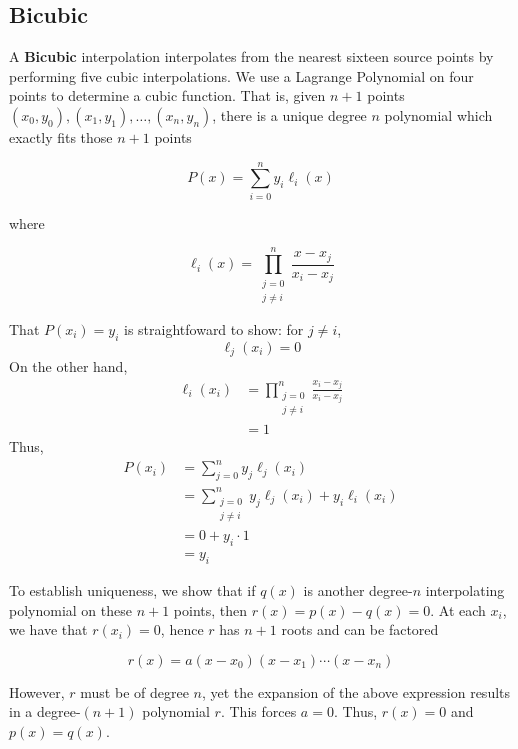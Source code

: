 \subsection{Bicubic} \label{subsec:bicubic}

A \textbf{Bicubic} interpolation interpolates from the nearest sixteen source points by performing five cubic interpolations. We use a Lagrange Polynomial on four points to determine a cubic function. That is, given $n+1$ points $(x_0,y_0), (x_1,y_1),\hdots, (x_n, y_n)$, there is a unique degree $n$ polynomial which exactly fits those $n+1$ points

\[P(x)=\sum_{i=0}^ny_i\ell_i(x)\]

where 

\[\ell_i(x)=\prod_{\substack{j=0\\j\neq i}}^n\frac{x-x_j}{x_i-x_j}\]

That $P(x_i)=y_i$ is straightfoward to show: for $j\neq i$, \[\ell_j(x_i)=0\] On the other hand, \begin{align*}\ell_i(x_i)&=\prod_{\substack{j=0\\j\neq i}}^n\frac{x_i-x_j}{x_i-x_j}\\&=1\end{align*} Thus, \begin{align*}P(x_i)&=\sum_{j=0}^ny_j\ell_j(x_i)\\&=\sum_{\substack{j=0\\j\neq i}}^ny_j\ell_j(x_i)+y_i\ell_i(x_i)\\&=0+y_i\cdot1\\&=y_i\end{align*}

To establish uniqueness, we show that if $q(x)$ is another degree-$n$ interpolating polynomial on these $n+1$ points, then $r(x)=p(x)-q(x)=0$. At each $x_i$, we have that $r(x_i)=0$, hence $r$ has $n+1$ roots and can be factored

\[r(x)=a(x-x_0)(x-x_1)\cdots(x-x_n)\]

However, $r$ must be of degree $n$, yet the expansion of the above expression results in a degree-$(n+1)$ polynomial $r$. This forces $a=0$. Thus, $r(x)=0$ and $p(x)=q(x)$. 

